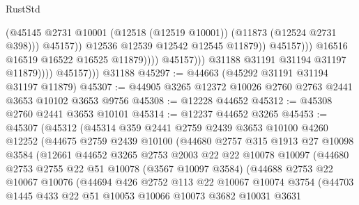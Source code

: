 \begin{lexlean}{RustStd}
\begin{coremodule}
                                              (@45145
                                                @2731
                                                @10001
                                                (@12518 (@12519 @10001))
                                                (@11873 (@12524 @2731 @398)))
                                              @45157))
                                          @12536
                                          @12539
                                          @12542
                                          @12545
                                          @11879))
                                      @45157)))
                                @16516
                                @16519
                                @16522
                                @16525
                                @11879))))
                        @45157)))
                  @31188
                  @31191
                  @31194
                  @31197
                  @11879))))
          @45157)))
    @31188
@45297 := @44663 (@45292 @31191 @31194 @31197 @11879)
@45307 := @44905 @3265 @12372 @10026 @2760 @2763 @2441 @3653 @10102 @3653 @9756
@45308 := @12228 @44652
@45312 := @45308 @2760 @2441 @3653 @10101
@45314 := @12237 @44652 @3265
@45453 := @45307
    (@45312
      (@45314
        @359
        @2441
        @2759
        @2439
        @3653
        @10100
        @4260
        @12252
        (@44675
          @2759
          @2439
          @10100
          (@44680
            @2757
            @315
            @1913
            @27
            @10098
            @3584
            (@12661
              @44652
              @3265
              @2753
              @2003
              @22
              @22
              @10078
              @10097
              (@44680
                @2753
                @2755
                @22
                @51
                @10078
                (@3567 @10097 @3584)
                (@44688
                  @2753
                  @22
                  @10067
                  @10076
                  (@44694
                    @426
                    @2752
                    @113
                    @22
                    @10067
                    @10074
                    @3754
                    (@44703
                      @1445
                      @433
                      @22
                      @51
                      @10053
                      @10066
                      @10073
                      @3682
                      @10031
                      @3631

\end{coremodule}
\end{lexlean}
